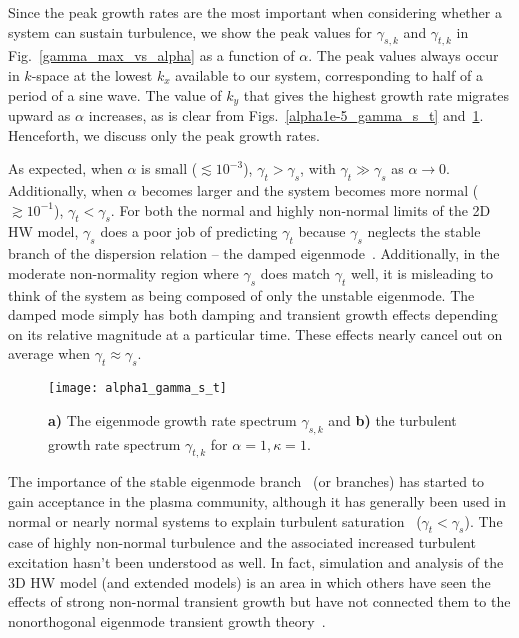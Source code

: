 \documentclass[twocolumn,showkeys,superscriptaddress]{revtex4}
\begin{document}
Since the peak growth rates are the most important when considering whether a system can sustain turbulence, we show the peak values for $\gamma_{s,k}$ and $\gamma_{t,k}$ in Fig.~\ref{gamma_max_vs_alpha} as a function of $\alpha$. 
The peak values always occur in $k$-space at the lowest $k_x$ available to our system, corresponding to half of a period of a sine wave. The value of $k_y$ that gives the highest growth rate migrates upward as $\alpha$ increases,
as is clear from Figs.~\ref{alpha1e-5_gamma_s_t} and~\ref{alpha1_gamma_s_t}. Henceforth, we discuss only the peak growth rates.

As expected, when $\alpha$ is small ($\lesssim 10^{-3}$), $\gamma_{t} > \gamma_{s}$, with
$\gamma_{t} \gg \gamma_{s}$ as $\alpha \to 0$. Additionally, when $\alpha$ becomes larger and the system becomes more normal ($\gtrsim 10^{-1}$), $\gamma_{t} < \gamma_{s}$.
For both the normal and highly non-normal limits of the 2D HW model, $\gamma_{s}$ does a poor job of predicting $\gamma_{t}$ because $\gamma_{s}$ neglects the stable branch of the
dispersion relation -- the damped eigenmode~\cite{makwana2011}. 
Additionally, in the moderate non-normality region where $\gamma_{s}$ does match $\gamma_{t}$ well, it is misleading to think of the system as being composed of only the unstable eigenmode. 
The damped mode simply has both damping and transient growth effects depending on its relative magnitude at a particular time. These effects nearly cancel out on average when $\gamma_{t} \approx \gamma_{s}$.

\begin{figure}
\centerline{\texttt{[image: alpha1\_gamma\_s\_t]}}
\caption{{\bf a)} The eigenmode growth rate spectrum $\gamma_{s,k}$ and {\bf b)} the turbulent growth rate spectrum $\gamma_{t,k}$ for $\alpha = 1, \kappa=1$.}
\label{alpha1_gamma_s_t}
\end{figure}

The importance of the stable eigenmode branch~\cite{baver2002} (or branches) has started to gain acceptance in the plasma community, although it has generally been used in normal
or nearly normal systems to explain turbulent saturation~\cite{terry2006b,hatch2011,makwana2011} ($\gamma_{t} < \gamma_{s}$). 
The case of highly non-normal turbulence and the associated increased turbulent excitation hasn't been understood as well. 
In fact, simulation and analysis of the 3D HW model (and extended models) is an area in which others have seen the effects of strong non-normal transient growth
but have not connected them to the nonorthogonal eigenmode transient growth theory~\cite{biskamp1995,drake1995,scott2002,scott2005,umansky2009,friedman2012b}.
\end{document}
